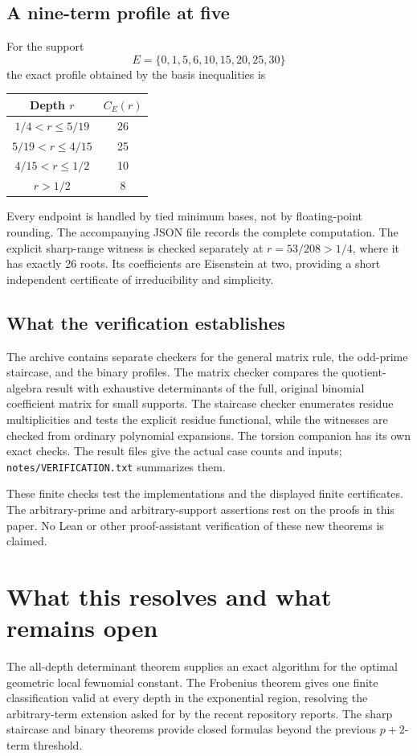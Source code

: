 \documentclass[11pt,letterpaper]{article}
\theoremstyle{definition}\newtheorem{definition}[theorem]{Definition}
\theoremstyle{remark}\newtheorem{remark}[theorem]{Remark}
\begin{document}
\subsection{A nine-term profile at five}
For the support
\[
 E=\{0,1,5,6,10,15,20,25,30\}
\]
the exact profile obtained by the basis inequalities is
\begin{center}
\begin{tabular}{cc}
\toprule
Depth $r$ & $C_E(r)$\\
\midrule
$1/4<r\le5/19$ & 26\\
$5/19<r\le4/15$ & 25\\
$4/15<r\le1/2$ & 10\\
$r>1/2$ & 8\\
\bottomrule
\end{tabular}
\end{center}
Every endpoint is handled by tied minimum bases, not by floating-point
rounding. The accompanying JSON file records the complete computation.
The explicit sharp-range witness is checked separately at
$r=53/208>1/4$, where it has exactly 26 roots. Its coefficients are
Eisenstein at two, providing a short independent certificate of
irreducibility and simplicity.

\subsection{What the verification establishes}
The archive contains separate checkers for the general matrix rule,
the odd-prime staircase, and the binary profiles. The matrix checker
compares the quotient-algebra result with exhaustive determinants of
the full, original binomial coefficient matrix for small supports.
The staircase checker enumerates residue multiplicities and tests the
explicit residue functional, while the witnesses are checked from
ordinary polynomial expansions. The torsion companion has its own
exact checks. The result files give the actual case counts and inputs;
\texttt{notes/VERIFICATION.txt} summarizes them.

These finite checks test the implementations and the displayed finite
certificates. The arbitrary-prime and arbitrary-support assertions
rest on the proofs in this paper. No Lean or other proof-assistant
verification of these new theorems is claimed.

\section{What this resolves and what remains open}
The all-depth determinant theorem supplies an exact algorithm for the
optimal geometric local fewnomial constant. The Frobenius theorem
gives one finite classification valid at every depth in the exponential
region, resolving the arbitrary-term extension asked for by the recent
repository reports. The sharp staircase and binary theorems provide
closed formulas beyond the previous $p+2$-term threshold.
\end{document}
